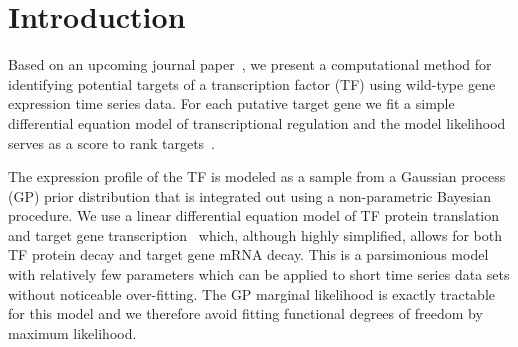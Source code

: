 \documentclass[accepted]{article}
\begin{document}



\section{Introduction}

Based on an upcoming journal paper~\citep{Honkela2010PNAS}, we present
a computational method for identifying potential targets of a
transcription factor (TF) using wild-type gene expression time series
data. For each putative target gene we fit a simple differential
equation model of transcriptional regulation and the model likelihood
serves as a score to rank targets~\citep{Lawrence2007,Gao2008}.

The expression profile of the TF is modeled as a sample from a
Gaussian process (GP) prior distribution that is integrated out using a
non-parametric Bayesian procedure. We use a linear differential 
equation model of TF protein translation and target gene transcription~\citep{Gao2008} which, 
although highly simplified, allows for both TF protein decay and target gene mRNA decay. This
is a parsimonious model with relatively few parameters which can be applied to short
time series data sets without noticeable over-fitting. The GP marginal likelihood is exactly tractable
for this model and we therefore avoid fitting functional degrees of freedom by maximum likelihood.
\end{document}
